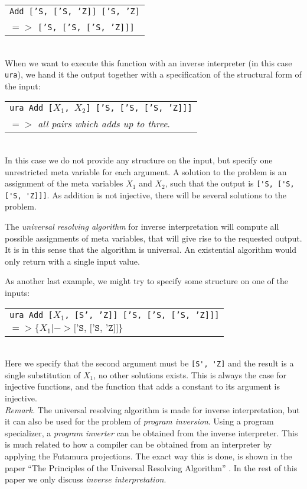 \documentclass[10pt]{../sigplanconf}
\begin{document}
\begin{tabular}{l}
\texttt{Add ['S, ['S, 'Z]] ['S, 'Z]} \\
\quad $=>$ \texttt{['S, ['S, ['S, 'Z]]]}
\end{tabular}\\

When we want to execute this function with an inverse interpreter (in
this case \texttt{ura}), we hand it the output together with a
specification of the structural form of the input:\\

\begin{tabular}{l}
  \texttt{ura Add [$X_1$, $X_2$] ['S, ['S, ['S, 'Z]]]} \\
   \quad $=>$ \textit{all pairs which adds up to three}.
\end{tabular}\\

In this case we do not provide any structure on the input, but specify
one unrestricted meta variable for each argument. A solution to the
problem is an assignment of the meta variables $X_1$ and $X_2$, such
that the output is \verb|['S, ['S, ['S, 'Z]]]|. As addition is not
injective, there will be several solutions to the problem. 

The \textit{universal resolving algorithm} for inverse interpretation
will compute all possible assignments of meta variables, that will
give rise to the requested output. It is in this sense that the
algorithm is universal. An existential algorithm would only return
with a single input value.

As another last example, we might try to specify some structure on one
of the inputs:\\

\begin{tabular}{l}
  \texttt{ura Add [$X_1$, [S', 'Z]] ['S, ['S, ['S, 'Z]]]} \\
   \quad $=> \{ X_1 |-> \texttt{['S, ['S, 'Z]]} \}$
\end{tabular}\\

Here we specify that the second argument must be \verb|[S', 'Z]| and
the result is a single substitution of $X_1$, no other solutions
exists. This is always the case for injective functions, and the
function that adds a constant to its argument is injective.\\

\textit{Remark.} The universal resolving algorithm is made for inverse
interpretation, but it can also be used for the problem of
\textit{program inversion}. Using a program specializer, a
\textit{program inverter} can be obtained from the inverse
interpreter. This is much related to how a compiler can be obtained
from an interpreter by applying the Futamura projections. The exact
way this is done, is shown in the paper ``The Principles of the
Universal Resolving Algorithm'' \cite{abramov2000universal}. In the
rest of this paper we only discuss \textit{inverse interpretation}.\\
\end{document}
